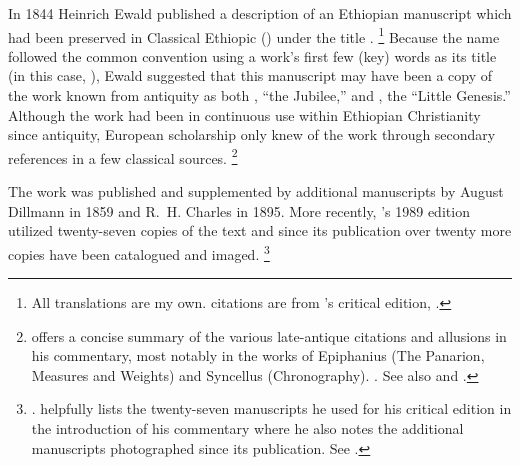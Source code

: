 


In 1844 Heinrich Ewald published a description of an Ethiopian manuscript which had been preserved in Classical Ethiopic (\geez) under the title .%
\footnote{All translations are my own. \geez citations are from \vanderkam's critical edition, \cite*{vanderkam1989}.}
Because the name followed the common convention using a work's first few (key) words as its title (in this case, ), Ewald suggested that this manuscript may have been a copy of the work known from antiquity as both , ``the Jubilee,'' and , the ``Little Genesis.''\autocite[176--179]{ewald_zkm1844} Although the work had been in continuous use within Ethiopian Christianity since antiquity, European scholarship only knew of the work through secondary references in a few classical sources.%
\footnote{\vanderkam offers a concise summary of the various late-antique citations and allusions in his commentary, most notably in the works of Epiphanius (The Panarion, Measures and Weights) and Syncellus (Chronography). \cite[1:10--14]{vanderkam2018}. See also \cite{reed_kister-etal2015} and \cite{kreps_ch2018}.%
}%

The work was published and supplemented by additional manuscripts by August Dillmann in 1859\autocite{dillmann1859} and R.~H. Charles in 1895.\autocite{charles1895} More recently, \vanderkam's 1989 edition utilized twenty-seven copies of the text\autocite[1:xiv--xvi]{vanderkam1989} and since its publication over twenty more copies have been catalogued and imaged.%
%
\footnote{%
\cite{erho_bsoas2013}.
\vanderkam helpfully lists the twenty-seven manuscripts he used for his critical edition in the introduction of his commentary where he also notes the additional manuscripts photographed since its publication. See \cite[1:14--16]{vanderkam2018}.
}


